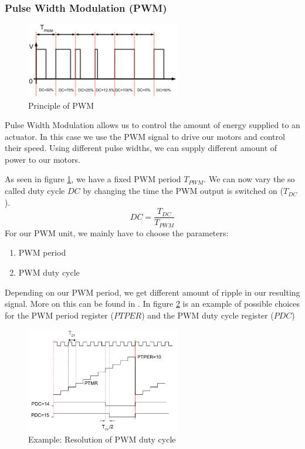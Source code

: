\subsubsection*{Pulse Width Modulation (PWM)}

\begin{figure}[htb]
    \centering
    \includegraphics[width=0.6\textwidth]{figures/software/pwm_demo.png}
    \caption {Principle of PWM \cite{alex}}
    \label{fig:pwm_demo}
\end{figure}

Pulse Width Modulation allows us to control the amount of energy supplied to an actuator. In this case we use the PWM signal to drive our motors and control their speed. Using different pulse widths, we can supply different amount of power to our motors. \cite{alex}


As seen in figure \ref{fig:pwm_demo}, we have a fixed PWM period $T_{PWM}$. We can now vary the so called duty cycle $DC$ by changing the time the PWM output is switched on ($T_{DC}$).
\begin{equation}
    DC = \frac{T_{DC}}{T_{PWM}}
\end{equation}
For our PWM unit, we mainly have to choose the parameters:
\begin{enumerate}
    \item PWM period
    \item PWM duty cycle
\end{enumerate}


Depending on our PWM period, we get different amount of ripple in our resulting signal. More on this can be found in \cite[Chapter~5.1]{alex}. In figure \ref{fig:pwm_choice} is an example of possible choices for the PWM period register ($PTPER$) and the PWM duty cycle register ($PDC$)

\begin{figure}[htb]
    \centering
    \includegraphics[width=0.6\textwidth]{figures/software/pwm_choice.png}
    \caption {Example: Resolution of PWM duty cycle \cite{alex}}
    \label{fig:pwm_choice}
\end{figure}

